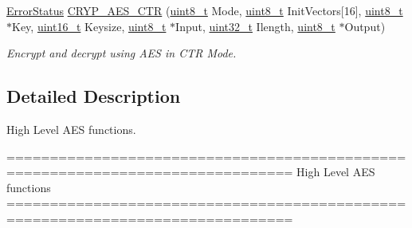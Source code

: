 \begin{DoxyCompactItemize}
\hyperlink{group___exported__types_ga8333b96c67f83cba354b3407fcbb6ee8}{Error\-Status} \hyperlink{group___c_r_y_p___group6_ga2f36aea6e94452e5e5e938547fb89d4c}{C\-R\-Y\-P\-\_\-\-A\-E\-S\-\_\-\-C\-T\-R} (\hyperlink{stdint_8h_aba7bc1797add20fe3efdf37ced1182c5}{uint8\-\_\-t} Mode, \hyperlink{stdint_8h_aba7bc1797add20fe3efdf37ced1182c5}{uint8\-\_\-t} Init\-Vectors\mbox{[}16\mbox{]}, \hyperlink{stdint_8h_aba7bc1797add20fe3efdf37ced1182c5}{uint8\-\_\-t} $\ast$Key, \hyperlink{stdint_8h_a273cf69d639a59973b6019625df33e30}{uint16\-\_\-t} Keysize, \hyperlink{stdint_8h_aba7bc1797add20fe3efdf37ced1182c5}{uint8\-\_\-t} $\ast$Input, \hyperlink{stdint_8h_a435d1572bf3f880d55459d9805097f62}{uint32\-\_\-t} Ilength, \hyperlink{stdint_8h_aba7bc1797add20fe3efdf37ced1182c5}{uint8\-\_\-t} $\ast$Output)
\begin{DoxyCompactList}\small\item\em Encrypt and decrypt using A\-E\-S in C\-T\-R Mode. \end{DoxyCompactList}\end{DoxyCompactItemize}


\subsection{Detailed Description}
High Level A\-E\-S functions. \begin{DoxyVerb} ===============================================================================
                          High Level AES functions
 ===============================================================================\end{DoxyVerb}
 

